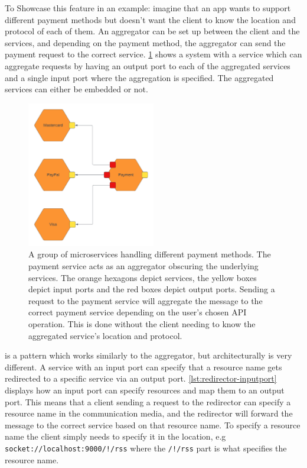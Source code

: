 To Showcase this feature in an example: imagine that an app wants to support different payment methods but doesn't want the client to know the location and protocol of each of them. An aggregator can be set up between the 
client and the services, and depending on the payment method, the aggregator can send the payment request to the correct service.
\cref{figure:aggregator_example} shows a system with a service which can aggregate requests by having an output port to each of the aggregated services and a single input port where the aggregation is specified. The aggregated services can either be embedded or not.
\begin{figure}[h!]
    \center
    \includegraphics[width=0.5\textwidth]{figures/aggregator_example.png}
    \caption{A group of microservices handling different payment methods. The payment service acts as an aggregator obscuring the underlying services. The orange hexagons depict services, the yellow boxes depict input ports and the red boxes depict output ports.
    Sending a request to the payment service will aggregate the message to the correct payment service depending on the user's chosen API operation. This is done without the client needing to know the aggregated service's location and protocol.}
    \label{figure:aggregator_example}
\end{figure}
 is a pattern which works similarly to the aggregator, but architecturally is very different.
A service with an input port can specify that a resource name gets redirected to a specific service via an output port.
\cref{lst:redirector-inputport} displays how an input port can specify resources and map them to an output port.
This means that a client sending a request to the redirector can specify a resource name in the communication media, and the redirector will forward the message to the correct service based on that resource name.
To specify a resource name the client simply needs to specify it in the location, e.g \texttt{socket://localhost:9000/!/rss} where the \texttt{/!/rss} part is what specifies the resource name.

